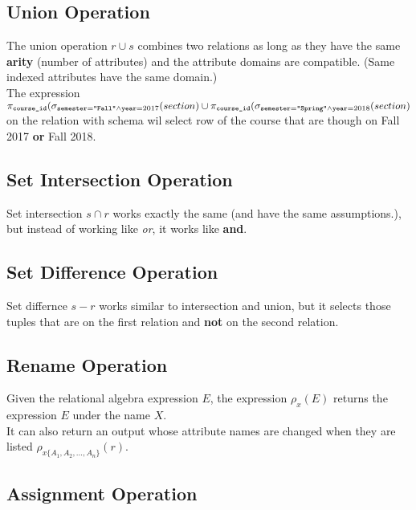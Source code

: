 \documentclass[11pt,a4paper,twocolumn]{book}
\begin{document}
\subsection{Union Operation}

The union operation $r \cup s$ combines two relations as long as they have the same \textbf{arity} (number of attributes) and the attribute domains are compatible. (Same indexed attributes have the same domain.)\\

The expression $\pi_{\texttt{course\_id}}(\sigma_{\texttt{semester}=\texttt{"Fall"} \land \texttt{year} = 2017}(section) \cup \pi_{\texttt{course\_id}}(\sigma_{\texttt{semester} = \texttt{"Spring"} \land \texttt{year} = 2018}(section)$ on the relation  with schema  wil select  row of the course that are though on Fall 2017 \textbf{or} Fall 2018.

\subsection{Set Intersection Operation}

Set intersection $s \cap r$ works exactly the same (and have the same assumptions.), but instead of working like \textit{or}, it works like \textbf{and}.

\subsection{Set Difference Operation} 

Set differnce $s - r$ works similar to intersection and union, but it selects those tuples that are on the first relation and \textbf{not} on the second relation.

\subsection{Rename Operation}

Given the relational algebra expression $E$, the expression $\rho_x(E)$ returns the expression $E$ under the name $X$.\\

It can also return an output whose attribute names are changed when they are listed $\rho_{x\{A_1, A_2, \dots, A_n\}}(r)$.

\subsection{Assignment Operation}
\end{document}
